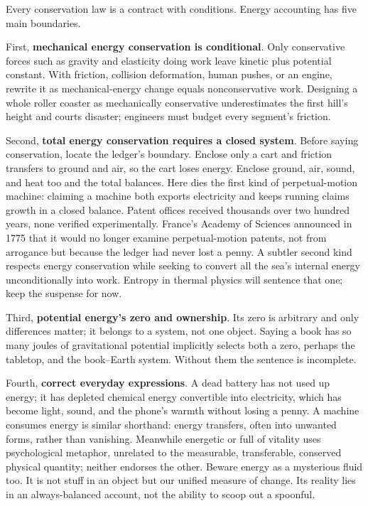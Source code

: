
Every conservation law is a contract with conditions. Energy accounting has five main boundaries.

First, \textbf{mechanical energy conservation is conditional}. Only conservative forces such as gravity and elasticity doing work leave kinetic plus potential constant. With friction, collision deformation, human pushes, or an engine, rewrite it as mechanical-energy change equals nonconservative work. Designing a whole roller coaster as mechanically conservative underestimates the first hill's height and courts disaster; engineers must budget every segment's friction.

Second, \textbf{total energy conservation requires a closed system}. Before saying conservation, locate the ledger's boundary. Enclose only a cart and friction transfers to ground and air, so the cart loses energy. Enclose ground, air, sound, and heat too and the total balances. Here dies the first kind of perpetual-motion machine: claiming a machine both exports electricity and keeps running claims growth in a closed balance. Patent offices received thousands over two hundred years, none verified experimentally. France's Academy of Sciences announced in 1775 that it would no longer examine perpetual-motion patents, not from arrogance but because the ledger had never lost a penny. A subtler second kind respects energy conservation while seeking to convert all the sea's internal energy unconditionally into work. Entropy in thermal physics will sentence that one; keep the suspense for now.

Third, \textbf{potential energy's zero and ownership}. Its zero is arbitrary and only differences matter; it belongs to a system, not one object. Saying a book has so many joules of gravitational potential implicitly selects both a zero, perhaps the tabletop, and the book--Earth system. Without them the sentence is incomplete.

Fourth, \textbf{correct everyday expressions}. A dead battery has not used up energy; it has depleted chemical energy convertible into electricity, which has become light, sound, and the phone's warmth without losing a penny. A machine consumes energy is similar shorthand: energy transfers, often into unwanted forms, rather than vanishing. Meanwhile energetic or full of vitality uses psychological metaphor, unrelated to the measurable, transferable, conserved physical quantity; neither endorses the other. Beware energy as a mysterious fluid too. It is not stuff in an object but our unified measure of change. Its reality lies in an always-balanced account, not the ability to scoop out a spoonful.

